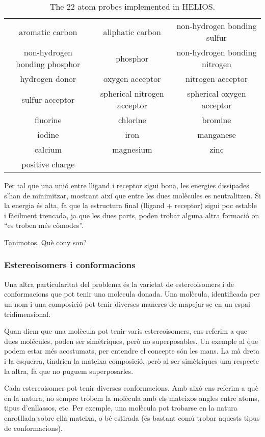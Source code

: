 \documentclass[titlepage,a4paper,12pt]{book}
\begin{document}
\begin{table}
\centering
\begin{tabular}{|ccc|}
\hline
aromatic carbon &aliphatic carbon&non-hydrogen bonding sulfur\\
non-hydrogen bonding phosphor&phosphor&non-hydrogen bonding nitrogen\\
hydrogen donor&oxygen acceptor&nitrogen acceptor\\
sulfur acceptor&spherical nitrogen acceptor&spherical oxygen acceptor\\
fluorine&chlorine&bromine\\
iodine&iron&manganese\\
calcium&magnesium&zinc\\
positive charge&& \\
\hline
\end{tabular}
\caption{The 22 atom probes implemented in HELIOS.}
\label{table:maps}
\end{table}

Per tal que una unió entre lligand i receptor sigui bona, les energies
dissipades s'han de minimitzar, mostrant així que entre les dues molècules es
neutralitzen.  Si la energia és alta, fa que la estructura final (lligand +
receptor) sigui poc estable i fàcilment trencada, ja que les dues parts, poden
trobar alguna altra formació on ``es troben més còmodes''.

Tanimotos. Què cony son? %

\subsubsection{Estereoisomers i conformacions}\label{ssub:estereoisomers i conformacions}

Una altra particularitat del problema és la varietat de estereoisomers i de
conformacions que pot tenir una molecula donada.  Una molècula, identificada per
un nom i una composició pot tenir diverses maneres de mapejar-se en un espai
tridimensional.

Quan diem que una molècula pot tenir varis estereoisomers, ens referim a que
dues molècules, poden ser simètriques, però no superposables.  Un exemple al que
podem estar més acostumats, per entendre el concepte són les mans.  La mà dreta
i la esquerra, tindrien la mateixa composició, però al ser simètriques una
respecte la altra, fa que no puguem superposarles.

Cada estereoisomer pot tenir diverses conformacions.  Amb això ens referim a què
en la natura, no sempre trobem la molècula amb els mateixos angles entre atoms,
tipus d'enllassos, etc. Per exemple, una molècula pot trobarse en la natura
enrotllada sobre ella mateixa, o bé estirada (és bastant comú trobar aquests
tipus de conformacions).
\end{document}
